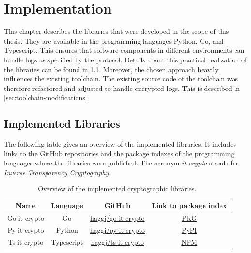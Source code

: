 \documentclass[../main.tex]{subfiles}
\begin{document}
\chapter{Implementation}
\label{chap:implementation}

This chapter describes the libraries that were developed in the scope of this thesis.
They are available in the programming languages Python, Go, and Typescript.
This ensures that software components in different environments can handle logs as specified by the protocol.
Details about this practical realization of the libraries can be found in \cref{sec:implemented-libraries}.
Moreover, the chosen approach heavily influences the existing toolchain.
The existing source code of the toolchain was therefore refactored and adjusted to handle encrypted logs.
This is described in \cref{sec:toolchain-modifications}.

\section{Implemented Libraries}
\label{sec:implemented-libraries}

The following table gives an overview of the implemented libraries.
It includes links to the GitHub repositories and the package indexes of the programming languages where the libraries were published.
The acronym \emph{it-crypto} stands for \emph{Inverse Transparency Cryptography}.

\begin{table}[ht]
    \centering
    \begin{tabular}{|c|c|c|c|}
    \hline
    Name         & Language & GitHub                           & Link to package index                                   \\ \hline
    Go-it-crypto & Go                   & \href{https://github.com/haggj/go-it-crypto}{haggj/go-it-crypto} & \href{https://pkg.go.dev/github.com/haggj/go-it-crypto}{PKG} \\ \hline
    Py-it-crypto & Python               & \href{https://github.com/haggj/py-it-crypto}{haggj/py-it-crypto} & \href{https://pypi.org/project/py-it-crypto/}{PyPI}          \\ \hline
    Ts-it-crypto & Typescript           & \href{https://github.com/haggj/ts-it-crypto}{haggj/ts-it-crypto} & \href{https://www.npmjs.com/package/ts-it-crypto}{NPM}       \\ \hline
    \end{tabular}
    \caption[Implemented libraries]{Overview of the implemented cryptographic libraries.}
\end{table}
\end{document}
